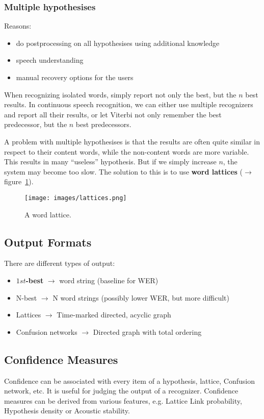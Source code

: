 \subsubsection{Multiple hypothesises}
Reasons:
\begin{itemize}
    \item do postprocessing on all hypothesises using additional knowledge
    \item speech understanding
    \item manual recovery options for the users
\end{itemize}
When recognizing isolated words, simply report not only the best, but the $n$ best results. In continuous speech recognition, we can either use multiple recognizers and report all their results, or let Viterbi not only remember the best predecessor, but the $n$ best predecessors.

A problem with multiple hypothesises is that the results are often quite similar in respect to their content words, while the non-content words are more variable. This results in many ``useless'' hypothesis. But if we simply increase $n$, the system may become too slow. The solution to this is to use \textbf{word lattices} ($\to$ figure~\ref{fig:wordLattice}).
\begin{figure}[htb]
\centering
\texttt{[image: images/lattices.png]}
\caption{\label{fig:wordLattice} A word lattice.}
\end{figure}

\subsection{Output Formats}
There are different types of output:
\begin{itemize}
\item \textbf{$1st$-best} $\to$ word string (baseline for WER)
\item N-best $\to$ N word strings (possibly lower WER, but more difficult)
\item Lattices $\to$ Time-marked directed, acyclic graph 
\item Confusion networks $\to$ Directed graph with total ordering
\end{itemize}

\subsection{Confidence Measures}
Confidence can be associated with every item of a hypothesis, lattice, Confusion network, etc.
It is useful for judging the output of a recognizer. Confidence measures can be derived from various features, e.g. Lattice Link probability, Hypothesis density or Acoustic stability.

